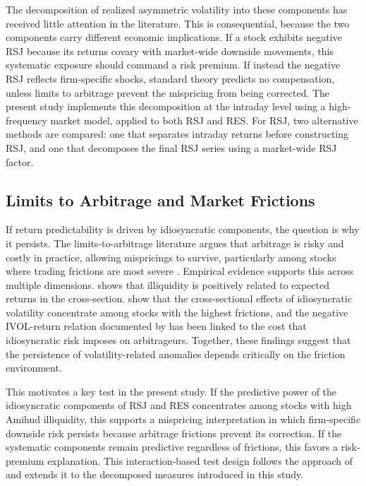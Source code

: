 \documentclass[11pt,a4paper]{article}
\begin{document}
The decomposition of realized asymmetric volatility into these components has received little attention in the literature. This is consequential, because the two components carry different economic implications. If a stock exhibits negative RSJ because its returns covary with market-wide downside movements, this systematic exposure should command a risk premium. If instead the negative RSJ reflects firm-specific shocks, standard theory predicts no compensation, unless limits to arbitrage prevent the mispricing from being corrected. The present study implements this decomposition at the intraday level using a high-frequency market model, applied to both RSJ and RES. For RSJ, two alternative methods are compared: one that separates intraday returns before constructing RSJ, and one that decomposes the final RSJ series using a market-wide RSJ factor.

\subsection{Limits to Arbitrage and Market Frictions}

If return predictability is driven by idiosyncratic components, the question is why it persists. The limits-to-arbitrage literature argues that arbitrage is risky and costly in practice, allowing mispricings to survive, particularly among stocks where trading frictions are most severe \citep{shleifer1997}. Empirical evidence supports this across multiple dimensions. \citet{amihud2002} shows that illiquidity is positively related to expected returns in the cross-section. \citet{bali2008} show that the cross-sectional effects of idiosyncratic volatility concentrate among stocks with the highest frictions, and the negative IVOL-return relation documented by \citet{ang2006} has been linked to the cost that idiosyncratic risk imposes on arbitrageurs. Together, these findings suggest that the persistence of volatility-related anomalies depends critically on the friction environment.

This motivates a key test in the present study. If the predictive power of the idiosyncratic components of RSJ and RES concentrates among stocks with high Amihud illiquidity, this supports a mispricing interpretation in which firm-specific downside risk persists because arbitrage frictions prevent its correction. If the systematic components remain predictive regardless of frictions, this favors a risk-premium explanation. This interaction-based test design follows the approach of \citet{atilgan2020} and extends it to the decomposed measures introduced in this study.
\end{document}
